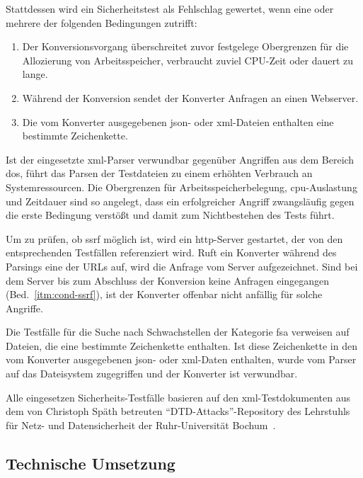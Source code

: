 \begin{samepage}
Stattdessen wird ein Sicherheitstest als Fehlschlag gewertet, wenn eine oder mehrere der folgenden Bedingungen zutrifft:
\begin{enumerate}
    \item{} Der Konversionsvorgang überschreitet zuvor festgelege Obergrenzen für die Allozierung von Arbeitsspeicher, verbraucht zuviel CPU-Zeit oder dauert zu lange.\label{itm:cond-dos}
    \item{} Während der Konversion sendet der Konverter Anfragen an einen Webserver.\label{itm:cond-ssrf}
    \item{} Die vom Konverter ausgegebenen \acrshort{json}- oder \acrshort{xml}-Dateien enthalten eine bestimmte Zeichenkette.\label{itm:cond-fsa}
\end{enumerate}
\end{samepage}

Ist der eingesetzte \acrshort{xml}-Parser verwundbar gegenüber Angriffen aus dem Bereich \acrfull{dos}, führt das Parsen der Testdateien zu einem erhöhten Verbrauch an Systemressourcen. Die Obergrenzen für Arbeitsspeicherbelegung, \acrshort{cpu}-Auslastung und Zeitdauer sind so angelegt, dass ein erfolgreicher Angriff zwangsläufig gegen die erste Bedingung verstößt und damit zum Nichtbestehen des Tests führt.

Um zu prüfen, ob \acrfull{ssrf} möglich ist, wird ein \acrshort{http}-Server gestartet, der von den entsprechenden Testfällen referenziert wird. Ruft ein Konverter während des Parsings eine der URLs auf, wird die Anfrage vom Server aufgezeichnet. Sind bei dem Server bis zum Abschluss der Konversion keine Anfragen eingegangen (Bed.~\ref{itm:cond-ssrf}), ist der Konverter offenbar nicht anfällig für solche Angriffe.

Die Testfälle für die Suche nach Schwachstellen der Kategorie \acrlong{fsa} verweisen auf Dateien, die eine bestimmte Zeichenkette enthalten. Ist diese Zeichenkette in den vom Konverter ausgegebenen \acrshort{json}- oder \acrshort{xml}-Daten enthalten, wurde vom Parser auf das Dateisystem zugegriffen und der Konverter ist verwundbar.

Alle eingesetzen Sicherheits-Testfälle basieren auf den \acrshort{xml}-Testdokumenten aus dem von Christoph Späth betreuten \enquote{DTD-Attacks}-Repository des Lehrstuhls für Netz- und Datensicherheit der Ruhr-Universität Bochum~\cite{dtdattacksrepo}.

\subsection{Technische Umsetzung}

